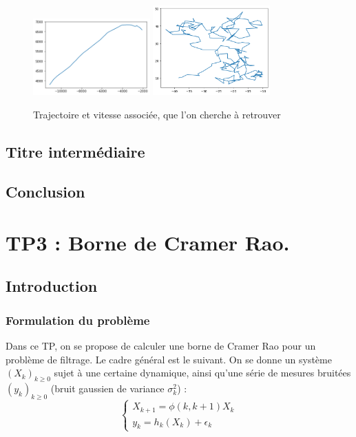\documentclass{article}
\begin{document}
\begin{figure}[ht]
\centering
\includegraphics[width=0.4\textwidth]{TP2/position_réelle.png}
\includegraphics[width=0.4\textwidth]{TP2/vitesse_reelle.png}
\caption{Trajectoire et vitesse associée, que l'on cherche à retrouver}
\end{figure}

\subsection{Titre intermédiaire}
\subsection{Conclusion}

\newpage
\section{TP3 : Borne de Cramer Rao.}
\subsection{Introduction}
\subsubsection{Formulation du problème}

Dans ce TP, on se propose de calculer une borne de Cramer Rao pour un problème de filtrage. Le cadre général est le suivant.
On se donne un système  $(X_{k})_{k\geq 0}$ sujet à une certaine dynamique,
ainsi qu'une série de mesures bruitées $(y_{k})_{k \geq 0}$ (bruit gaussien de variance $\sigma_{k}^{2}$) : 
\[\left\{\begin{array}{ll}
   X_{k+1} = \phi(k,k+1)X_{k} \\
   y_{k}=h_{k}(X_{k})+\epsilon_{k}
\end{array}\right. \]
\end{document}
